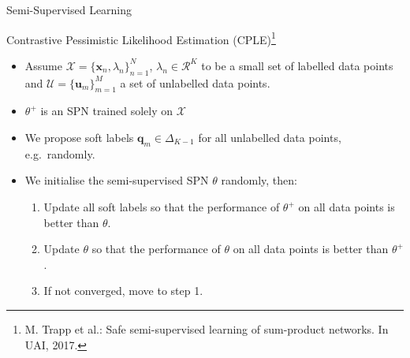 \begin{frame}{Semi-Supervised Learning}{}
\begin{block}{Contrastive Pessimistic Likelihood Estimation (CPLE)\footnote{\scriptsize M. Trapp et al.: Safe semi-supervised learning of sum-product networks. In UAI, 2017.}}
\begin{itemize}
    \item Assume $\mathcal{X} = \{\bm x_n, \lambda_n\}_{n=1}^N$, $\lambda_n \in \mathcal{R}^K$ to be a small set of labelled data points and $\mathcal{U} = \{\bm u_m\}_{m=1}^M$ a set of unlabelled data points.
    \item $\theta^+$ is an SPN trained solely on $\mathcal{X}$
    \item We propose soft labels $\bm q_m \in \Delta_{K-1}$ for all unlabelled data points, e.g.~randomly.
    \item We initialise the semi-supervised SPN $\theta$ randomly, then:
    \begin{enumerate}
        \item Update all soft labels so that the performance of $\theta^+$ on all data points is better than $\theta$.
        \item Update $\theta$ so that the performance of $\theta$ on all data points is better than $\theta^+$.
        \item If not converged, move to step 1.
    \end{enumerate}
\end{itemize}

\end{block}
\end{frame}


